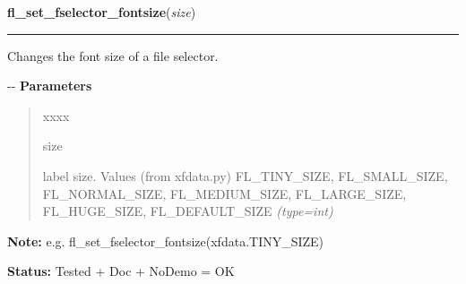     \label{xformslib:flgoodies:fl_set_fselector_fontsize}

    \vspace{0.5ex}

\hspace{.8\funcindent}\begin{boxedminipage}{\funcwidth}

    \raggedright \textbf{fl\_set\_fselector\_fontsize}(\textit{size})

    \vspace{-1.5ex}

    \rule{\textwidth}{0.5\fboxrule}
\setlength{\parskip}{2ex}

Changes the font size of a file selector.

-{}-
\setlength{\parskip}{1ex}
      \textbf{Parameters}
      \vspace{-1ex}

      \begin{quote}
        \begin{Ventry}{xxxx}

          \item[size]


label size. Values (from xfdata.py) FL\_TINY\_SIZE, FL\_SMALL\_SIZE,
FL\_NORMAL\_SIZE, FL\_MEDIUM\_SIZE, FL\_LARGE\_SIZE, FL\_HUGE\_SIZE,
FL\_DEFAULT\_SIZE
            {\it (type=int)}

        \end{Ventry}

      \end{quote}

\textbf{Note:} 
e.g. fl\_set\_fselector\_fontsize(xfdata.TINY\_SIZE)


\textbf{Status:} 
Tested + Doc + NoDemo = OK


    \end{boxedminipage}

    \label{xformslib:flgoodies:fl_set_fselector_fontstyle}

    \vspace{0.5ex}

